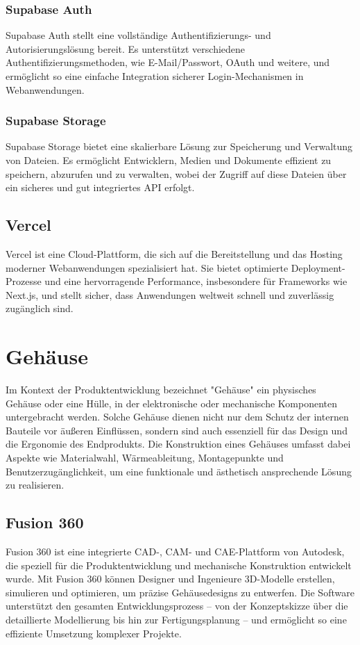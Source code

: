 \begin{inhalt}
\subsubsection{Supabase Auth}
Supabase Auth stellt eine vollständige Authentifizierungs- und Autorisierungslösung bereit. Es unterstützt verschiedene Authentifizierungsmethoden, wie E-Mail/Passwort, OAuth und weitere, und ermöglicht so eine einfache Integration sicherer Login-Mechanismen in Webanwendungen.

\subsubsection{Supabase Storage}
Supabase Storage bietet eine skalierbare Lösung zur Speicherung und Verwaltung von Dateien. Es ermöglicht Entwicklern, Medien und Dokumente effizient zu speichern, abzurufen und zu verwalten, wobei der Zugriff auf diese Dateien über ein sicheres und gut integriertes API erfolgt.

\subsection{Vercel}
Vercel ist eine Cloud-Plattform, die sich auf die Bereitstellung und das Hosting moderner Webanwendungen spezialisiert hat. Sie bietet optimierte Deployment-Prozesse und eine hervorragende Performance, insbesondere für Frameworks wie Next.js, und stellt sicher, dass Anwendungen weltweit schnell und zuverlässig zugänglich sind.

\section{Gehäuse}  
Im Kontext der Produktentwicklung bezeichnet "Gehäuse" ein physisches Gehäuse oder eine Hülle, in der elektronische oder mechanische Komponenten untergebracht werden. Solche Gehäuse dienen nicht nur dem Schutz der internen Bauteile vor äußeren Einflüssen, sondern sind auch essenziell für das Design und die Ergonomie des Endprodukts. Die Konstruktion eines Gehäuses umfasst dabei Aspekte wie Materialwahl, Wärmeableitung, Montagepunkte und Benutzerzugänglichkeit, um eine funktionale und ästhetisch ansprechende Lösung zu realisieren.

\subsection{Fusion 360}
\label{ref:fusion360_grundlagen}
Fusion 360 ist eine integrierte CAD-, CAM- und CAE-Plattform von Autodesk, die speziell für die Produktentwicklung und mechanische Konstruktion entwickelt wurde. Mit Fusion 360 können Designer und Ingenieure 3D-Modelle erstellen, simulieren und optimieren, um präzise Gehäusedesigns zu entwerfen. Die Software unterstützt den gesamten Entwicklungsprozess – von der Konzeptskizze über die detaillierte Modellierung bis hin zur Fertigungsplanung – und ermöglicht so eine effiziente Umsetzung komplexer Projekte.


\end{inhalt}
